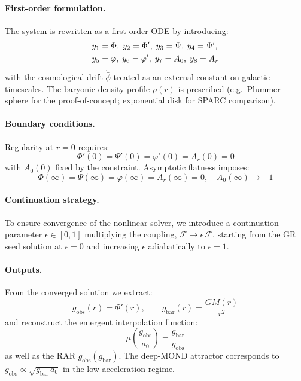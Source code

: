 \documentclass[aps,prd,twocolumn,superscriptaddress,nofootinbib]{revtex4-2}
\begin{document}
\paragraph{First-order formulation.}
The system is rewritten as a first-order ODE by introducing:
\begin{align}
y_1 &= \Phi,\; y_2 = \Phi',\; y_3 = \Psi,\; y_4 = \Psi', \notag \\
y_5 &= \varphi,\; y_6 = \varphi',\; y_7 = A_0,\; y_8 = A_r
\end{align}
with the cosmological drift $\dot{\bar{\phi}}$ treated as an external constant on galactic timescales. The baryonic density profile $\rho(r)$ is prescribed (e.g.\ Plummer sphere for the proof-of-concept; exponential disk for SPARC comparison).

\paragraph{Boundary conditions.}
Regularity at $r = 0$ requires:
\begin{equation}
\Phi'(0) = \Psi'(0) = \varphi'(0) = A_r(0) = 0
\end{equation}
with $A_0(0)$ fixed by the constraint. Asymptotic flatness imposes:
\begin{equation}
\Phi(\infty) = \Psi(\infty) = \varphi(\infty) = A_r(\infty) = 0, \quad A_0(\infty) \to -1
\end{equation}

\paragraph{Continuation strategy.}
To ensure convergence of the nonlinear solver, we introduce a continuation parameter $\epsilon \in [0,1]$ multiplying the coupling, $\mathcal{F} \to \epsilon\,\mathcal{F}$, starting from the GR seed solution at $\epsilon = 0$ and increasing $\epsilon$ adiabatically to $\epsilon = 1$.

\paragraph{Outputs.}
From the converged solution we extract:
\begin{equation}
g_{\mathrm{obs}}(r) = \Phi'(r), \qquad g_{\mathrm{bar}}(r) = \frac{GM(r)}{r^2}
\end{equation}
and reconstruct the emergent interpolation function:
\begin{equation}
\mu\!\left(\frac{g_{\mathrm{obs}}}{a_0}\right) = \frac{g_{\mathrm{bar}}}{g_{\mathrm{obs}}}
\label{eq:mu_numerical}
\end{equation}
as well as the RAR $g_{\mathrm{obs}}(g_{\mathrm{bar}})$. The deep-MOND attractor corresponds to $g_{\mathrm{obs}} \propto \sqrt{g_{\mathrm{bar}}\,a_0}$ in the low-acceleration regime.
\end{document}
